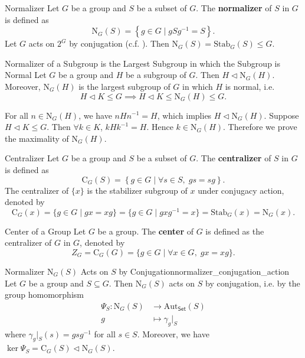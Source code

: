 \begin{definition}{Normalizer}{}
    Let $G$ be a group and $S$ be a subset of $G$. The \textbf{normalizer} of $S$ in $G$ is defined as
    $$
        \mathrm{N}_G(S)=\left\{ g\in G\mid gSg^{-1}=S \right\}.
    $$
    Let $G$ acts on $2^G$ by conjugation (c.f. ). Then $\mathrm{N}_G(S)=\mathrm{Stab}_G(S)\le G$.
\end{definition}

\begin{proposition}{Normalizer of a Subgroup is the Largest Subgroup in which the Subgroup is Normal}{}
    Let $G$ be a group and $H$ be a subgroup of $G$. Then $H\lhd\mathrm{N}_G(H)$. Moreover, $\mathrm{N}_G(H)$ is the largest subgroup of $G$ in which $H$ is normal, i.e. $$H\lhd K\le G\implies H\lhd K\le \mathrm{N}_G(H)\le G.$$
\end{proposition}

\begin{prf}
    For all $n\in \mathrm{N}_G(H)$, we have $nHn^{-1}=H$, which implies $H \lhd \mathrm{N}_G(H)$. Suppose $H\lhd K\le G$. Then $\forall k\in K$, $kHk^{-1}=H$. Hence $k\in \mathrm{N}_G(H)$. Therefore we prove the maximality of $\mathrm{N}_G(H)$.
\end{prf}

\begin{definition}{Centralizer}{}
    Let $G$ be a group and $S$ be a subset of $G$. The \textbf{centralizer} of $S$ in $G$ is defined as
    \[
        \mathrm{C}_G(S)=\left\{g\in G\mid  \forall s\in S,\;gs=sg\right\}.
    \]
    The centralizer of $\{x\}$ is the stabilizer subgroup of $x$ under conjugacy action, denoted by
    \[
        \mathrm{C}_G(x)=\{ g\in G\mid gx=xg \}=\{ g\in G\mid gxg^{-1}=x \}= \mathrm{Stab}_G(x)=\mathrm{N}_G(x).
    \]

\end{definition}



\begin{definition}{Center of a Group}{}
    Let $G$ be a group. The \textbf{center} of $G$ is defined as the centralizer of $G$ in $G$, denoted by
    \[
        Z_G=\mathrm{C}_G(G)=\{ g\in G\mid \forall x\in G,\; gx=xg\}.
    \]
\end{definition}



\begin{proposition}{Normalizer $\mathrm{N}_G(S)$ Acts on $S$ by Conjugation}{normalizer_conjugation_action}
    Let $G$ be a group and $S\subseteq G$. Then $\mathrm{N}_G(S)$ acts on $S$ by conjugation, i.e. by the group homomorphism
    \begin{align*}
        \Psi_S: \mathrm{N}_G(S) & \longrightarrow \mathrm{Aut}_{\mathsf{Set}}(S) \\
        g                       & \longmapsto \gamma_g|_S
    \end{align*}
    where $\gamma_g|_S(s)=gsg^{-1}$ for all $s\in S$. Moreover, we have $\ker\Psi_S=\mathrm{C}_G(S)\lhd \mathrm{N}_G(S)$.
\end{proposition}

